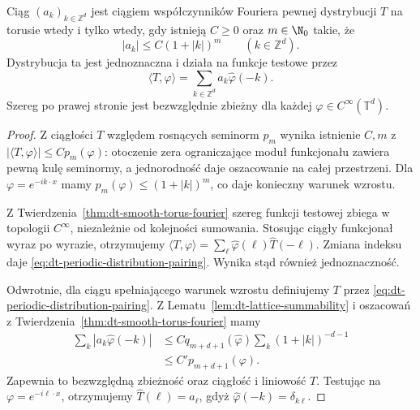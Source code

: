 \begin{twierdzenie}
\label{thm:dt-periodic-distribution-fourier}
Ciąg $(a_k)_{k\in\mathbb Z^d}$ jest ciągiem
współczynników Fouriera pewnej dystrybucji $T$
na torusie wtedy i tylko wtedy, gdy istnieją
$C\ge0$ oraz $m\in\N_0$ takie, że
\[
 |a_k|\le C(1+|k|)^m\qquad(k\in\mathbb Z^d).
\]
Dystrybucja ta jest jednoznaczna i działa na
funkcje testowe przez
\begin{equation}\label{eq:dt-periodic-distribution-pairing}
 \langle T,\varphi\rangle
 =\sum_{k\in\mathbb Z^d}a_k\widehat\varphi(-k).
\end{equation}
Szereg po prawej stronie jest bezwzględnie
zbieżny dla każdej $\varphi\in C^\infty(\mathbb T^d)$.
\end{twierdzenie}
\begin{proof}
Z ciągłości $T$ względem rosnących seminorm $p_m$
wynika istnienie $C,m$ z
$|\langle T,\varphi\rangle|\le Cp_m(\varphi)$:
otoczenie zera ograniczające moduł funkcjonału
zawiera pewną kulę seminormy, a jednorodność
daje oszacowanie na całej przestrzeni.
Dla $\varphi=e^{-ik\cdot x}$ mamy
$p_m(\varphi)\le(1+|k|)^m$,
co daje konieczny warunek wzrostu.

Z Twierdzenia~\ref{thm:dt-smooth-torus-fourier}
szereg funkcji testowej zbiega w topologii
$C^\infty$, niezależnie od kolejności sumowania.
Stosując ciągły funkcjonał wyraz po wyrazie,
otrzymujemy
$\langle T,\varphi\rangle
=\sum_\ell\widehat\varphi(\ell)\widehat T(-\ell)$.
Zmiana indeksu daje \eqref{eq:dt-periodic-distribution-pairing}.
Wynika stąd również jednoznaczność.

Odwrotnie, dla ciągu spełniającego warunek wzrostu
definiujemy $T$ przez \eqref{eq:dt-periodic-distribution-pairing}.
Z Lematu~\ref{lem:dt-lattice-summability} i oszacowań
z Twierdzenia~\ref{thm:dt-smooth-torus-fourier} mamy
\[
 \begin{aligned}
 \sum_k|a_k\widehat\varphi(-k)|
 &\le C q_{m+d+1}(\widehat\varphi)
 \sum_k(1+|k|)^{-d-1}\\
 &\le C' p_{m+d+1}(\varphi).
 \end{aligned}
\]
Zapewnia to bezwzględną zbieżność oraz ciągłość
i liniowość $T$.
Testując na $\varphi=e^{-i\ell\cdot x}$,
otrzymujemy $\widehat T(\ell)=a_\ell$,
gdyż $\widehat\varphi(-k)=\delta_{k\ell}$.
\end{proof}

